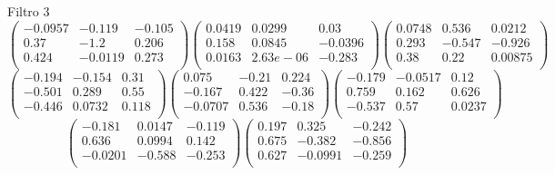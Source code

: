 Filtro 3
{ \small
\[
\begin{pmatrix}
  -0.0957 & -0.119 & -0.105 \\
  0.37 & -1.2 & 0.206 \\
  0.424 & -0.0119 & 0.273 \\
\end{pmatrix}
\begin{pmatrix}
  0.0419 & 0.0299 & 0.03 \\
  0.158 & 0.0845 & -0.0396 \\
  0.0163 & 2.63e-06 & -0.283 \\
\end{pmatrix}
\begin{pmatrix}
  0.0748 & 0.536 & 0.0212 \\
  0.293 & -0.547 & -0.926 \\
  0.38 & 0.22 & 0.00875 \\
\end{pmatrix}
\]
\[
\begin{pmatrix}
  -0.194 & -0.154 & 0.31 \\
  -0.501 & 0.289 & 0.55 \\
  -0.446 & 0.0732 & 0.118 \\
\end{pmatrix}
\begin{pmatrix}
  0.075 & -0.21 & 0.224 \\
  -0.167 & 0.422 & -0.36 \\
  -0.0707 & 0.536 & -0.18 \\
\end{pmatrix}
\begin{pmatrix}
  -0.179 & -0.0517 & 0.12 \\
  0.759 & 0.162 & 0.626 \\
  -0.537 & 0.57 & 0.0237 \\
\end{pmatrix}
\]
\[
\begin{pmatrix}
  -0.181 & 0.0147 & -0.119 \\
  0.636 & 0.0994 & 0.142 \\
  -0.0201 & -0.588 & -0.253 \\
\end{pmatrix}
\begin{pmatrix}
  0.197 & 0.325 & -0.242 \\
  0.675 & -0.382 & -0.856 \\
  0.627 & -0.0991 & -0.259 \\
\end{pmatrix}
\]
}

